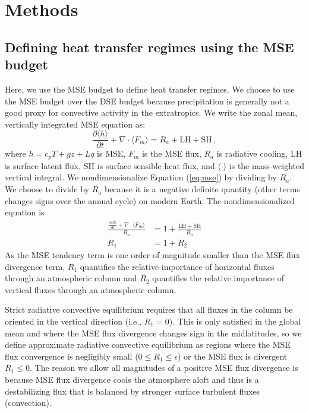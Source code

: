 \documentclass{ametsocV5}
\begin{document}
\section{Methods}

\subsection{Defining heat transfer regimes using the MSE budget}

    Here, we use the MSE budget to define heat transfer regimes. We choose to use the MSE budget over the DSE budget because precipitation is generally not a good proxy for convective activity in the extratropics. We write the zonal mean, vertically integrated MSE equation as: 
    \begin{equation} \label{eq:mse}
        \frac{\partial \langle h \rangle}{\partial t} + \nabla\cdot \langle F_{m} \rangle = R_{a} + \mathrm{LH+SH} \, ,
    \end{equation}
    where $h=c_p T + gz + Lq$ is MSE, $F_m$ is the MSE flux, $R_a$ is radiative cooling, $\mathrm{LH}$ is surface latent flux, $\mathrm{SH}$ is surface sensible heat flux, and $\langle \cdot \rangle$ is the mass-weighted vertical integral. We nondimensionalize Equation (\ref{eq:mse}) by dividing by \(R_{a}\). We choose to divide by $R_a$ because it is a negative definite quantity (other terms changes signs over the annual cycle) on modern Earth. The nondimensionalized equation is
    \begin{align}
        \frac{\frac{\partial \langle h \rangle}{\partial t} + \nabla\cdot \langle F_{m} \rangle }{R_{a}} &= 1 + \frac{\mathrm{LH+SH}}{R_{a}} \\
        R_{1} &= 1 + R_{2}
    \end{align}
    As the MSE tendency term is one order of magnitude smaller than the MSE flux divergence term, \(R_{1}\) quantifies the relative importance of horizontal fluxes through an atmospheric column and \(R_{2}\) quantifies the relative importance of vertical fluxes through an atmospheric column.
    
    Strict radiative convective equilibrium requires that all fluxes in the column be oriented in the vertical direction (i.e., \(R_{1}=0\)). This is only satisfied in the global mean and where the MSE flux divergence changes sign in the midlatitudes, so we define approximate radiative convective equilibrium as regions where the MSE flux convergence is negligibly small (\(0 \le R_{1} \le \epsilon\)) or the MSE flux is divergent \(R_{1}\le 0\). The reason we allow all magnitudes of a positive MSE flux divergence is because MSE flux divergence cools the atmosphere aloft and thus is a destabilizing flux that is balanced by stronger surface turbulent fluxes (convection).
    
\end{document}

